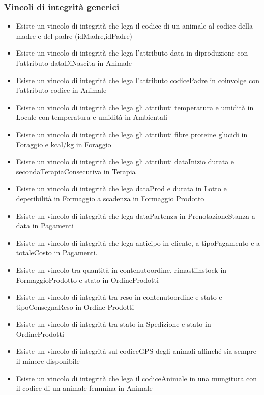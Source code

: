 \documentclass[12pt,a4paper]{article}
\begin{document}
 \subsubsection{Vincoli di integrità generici}
   \begin{itemize}
     \item Esiste un vincolo di integrità che lega il codice di un animale al codice della madre e del padre (idMadre,idPadre)
     \item Esiste un vincolo di integrità che lega l'attributo data in diproduzione con l'attributo dataDiNascita in Animale
     \item Esiste un vincolo di integrità che lega l'attributo codicePadre in coinvolge con l'attributo codice in Animale
     \item Esiste un vincolo di integrità che lega gli attributi temperatura e umidità in Locale con temperatura e umidità in Ambientali
     \item Esiste un vincolo di integrità che lega gli attributi fibre proteine glucidi in Foraggio e kcal/kg in Foraggio
     \item Esiste un vincolo di integrità che lega gli attributi dataInizio durata e secondaTerapiaConsecutiva in Terapia
     \item Esiste un vincolo di integrità che lega dataProd e durata in Lotto e deperibilità in Formaggio a scadenza in Formaggio Prodotto
     \item Esiste un vincolo di integrità che lega dataPartenza in PrenotazioneStanza a data in Pagamenti
     \item Esiste un vincolo di integrità che lega anticipo in cliente, a tipoPagamento e a totaleCosto in Pagamenti.
     \item Esiste un vincolo tra quantità in contenutoordine, rimastiinstock in FormaggioProdotto e stato in OrdineProdotti
     \item Esiste un vincolo di integrità tra reso in contenutoordine e stato e tipoConsegnaReso in Ordine Prodotti
     \item Esiste un vincolo di integrità tra stato in Spedizione e stato in OrdineProdotti
     \item Esiste un vincolo di integrità sul codiceGPS degli animali affinché sia sempre il minore disponibile
     \item Esiste un vincolo di integrità che lega il codiceAnimale in una mungitura con il codice di un animale femmina in Animale
   \end{itemize}
   
\end{document}
